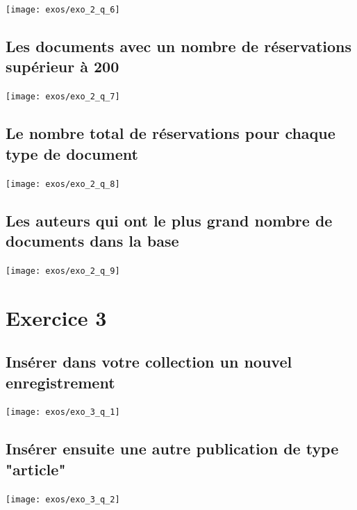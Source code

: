 \documentclass[12pt,a4paper]{article}
\begin{document}
\begin{center}
	\texttt{[image: exos/exo\_2\_q\_6]}
\end{center}

\subsection{Les documents avec un nombre de réservations supérieur à 200}

\begin{center}
	\texttt{[image: exos/exo\_2\_q\_7]}
\end{center}

\subsection{Le nombre total de réservations pour chaque type de document}

\begin{center}
	\texttt{[image: exos/exo\_2\_q\_8]}
\end{center}

\subsection{Les auteurs qui ont le plus grand nombre de documents dans la base}

\begin{center}
	\texttt{[image: exos/exo\_2\_q\_9]}
\end{center}

\newpage

\section{Exercice 3}

\subsection{Insérer dans votre collection un nouvel enregistrement}

\begin{center}
	\texttt{[image: exos/exo\_3\_q\_1]}
\end{center}

\subsection{Insérer ensuite une autre publication de type "article"}

\begin{center}
	\texttt{[image: exos/exo\_3\_q\_2]}
\end{center}
\end{document}

